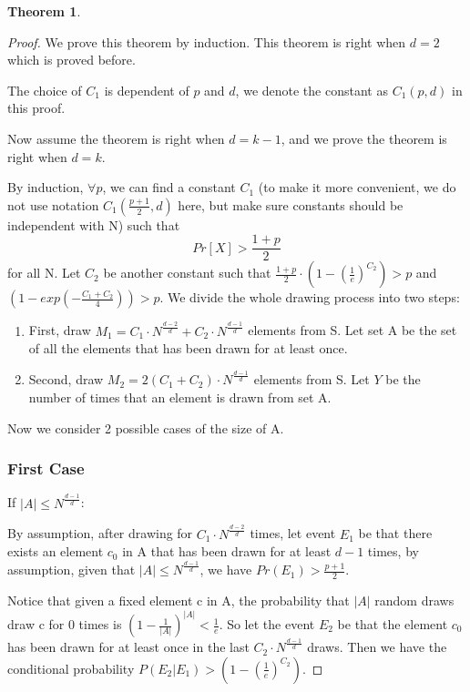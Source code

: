 \documentclass{article}
\newtheorem{theorem}{Theorem}
\begin{document}
\begin{spacing}{1.1}
\begin{theorem}
    \end{theorem}

    \begin{proof}

    We prove this theorem by induction. This theorem is right when $d=2$ which is proved before.

    The choice of $C_1$ is dependent of $p$ and $d$, we denote the constant as $C_1(p,d)$ in this proof.

    Now assume the theorem is right when $d=k-1$, and we prove the theorem is right when $d=k$.

    By induction, $\forall p$, we can find a constant $C_1$ (to make it more convenient, we do not use notation $C_1(\frac{p+1}{2}, d)$ here, but make sure constants should be independent with N) such that
    $$Pr[X] > \frac{1+p}{2}$$
    for all N. Let $C_2$ be another constant such that $\frac{1+p}{2} \cdot (1 - (\frac{1}{e})^{C_2}) > p$ and $(1 - exp(-\frac{C_1 + C_2}{4})) > p$. We divide the whole drawing process into two steps:
    \begin{enumerate}
        \item First, draw $M_1 = C_1 \cdot N^{\frac{d-2}{d}} + C_2 \cdot N^{\frac{d-1}{d}}$ elements from S. Let set A be the set of all the elements that has been drawn for at least once.
        \item Second, draw $M_2 = 2(C_1 + C_2)\cdot N^{\frac{d-1}{d}}$ elements from S. Let $Y$ be the number of times that an element is drawn from set A.
    \end{enumerate}
    Now we consider 2 possible cases of the size of A.

    \subsubsection{First Case}\label{fir-case}
    If $|A| \leq N^{\frac{d-1}{d}}$:

    By assumption, after drawing for $C_1 \cdot N^{\frac{d-2}{d}}$ times, let event $E_1$ be that there exists an element $c_0$ in A that has been drawn for at least $d-1$ times, by assumption, given that $|A| \leq N^{\frac{d-1}{d}}$, we have $Pr(E_1) > \frac{p+1}{2}$.

    Notice that given a fixed element c in A, the probability that $|A|$ random draws draw c for 0 times is $(1 - \frac{1}{|A|})^{|A|} < \frac{1}{e}$. So let the event $E_2$ be that the element $c_0$ has been drawn for at least once in the last $C_2 \cdot N^{\frac{d-1}{d}}$ draws. Then we have the conditional probability $P(E_2|E_1) > (1 - (\frac{1}{e})^{C_2})$.


\end{proof}
\end{spacing}
\end{document}
